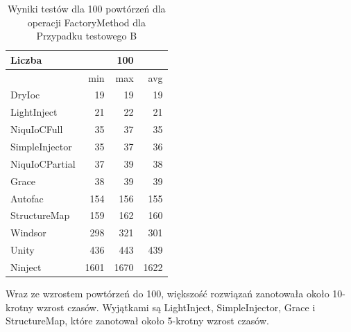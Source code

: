 \documentclass[12pt]{article}
\begin{document}
\begin{table}[H]
\captionsetup{belowskip=0pt,aboveskip=0pt}
\begin{center}
\begin{small}
	\begin{tabular}{ | l | r r r | }
    		\hline
Liczba & & 100 & \\ \hline
 & min & max & avg \\ \hline
DryIoc & 19 & 19 & 19 \\ \hline
LightInject & 21 & 22 & 21 \\ \hline
NiquIoCFull & 35 & 37 & 35 \\ \hline
SimpleInjector & 35 & 37 & 36 \\ \hline
NiquIoCPartial & 37 & 39 & 38 \\ \hline
Grace & 38 & 39 & 39 \\ \hline
Autofac & 154 & 156 & 155 \\ \hline
StructureMap & 159 & 162 & 160 \\ \hline
Windsor & 298 & 321 & 301 \\ \hline
Unity & 436 & 443 & 439 \\ \hline
Ninject & 1601 & 1670 & 1622 \\ \hline
  	\end{tabular}
\end{small}
\end{center}
\caption{Wyniki testów dla 100 powtórzeń dla operacji FactoryMethod dla Przypadku testowego B}
\label{TestCaseB_FactoryMethod100}
\end{table}
Wraz ze wzrostem powtórzeń do 100, większość rozwiązań zanotowała około 10-krotny wzrost czasów. Wyjątkami są LightInject, SimpleInjector, Grace i StructureMap, które zanotował około 5-krotny wzrost czasów.
\\ \\
\end{document}
